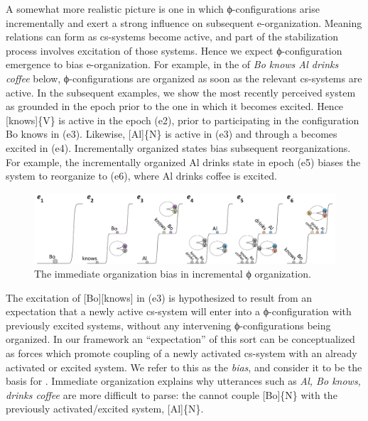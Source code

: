   A somewhat more realistic picture is one in which ϕ-configurations arise incrementally and exert a strong influence on subsequent e-organization. Meaning relations can form as cs-systems become active, and part of the stabilization process involves excitation of those systems. Hence we expect ϕ-configuration emergence to bias e-organization. For example, in the  of \textit{Bo knows Al drinks coffee} below, ϕ-configurations are organized as soon as the relevant cs-systems are active. In the subsequent examples, we show the most recently perceived system as grounded in the epoch prior to the one in which it becomes excited.  Hence [knows]\{V\} is active in the epoch (e2), prior to participating in the configuration {\textbar}Bo knows{\textbar} in (e3). Likewise, [Al]\{N\} is active in (e3) and through a  becomes excited in (e4). Incrementally organized states bias subsequent reorganizations. For example, the incrementally organized {\textbar}Al drinks{\textbar} state in epoch (e5) biases the system to reorganize to (e6), where {\textbar}Al drinks coffee{\textbar} is excited. 

  
\begin{figure}
\includegraphics[width=\textwidth]{figures/Tilsen-img129.png}
\caption{The immediate organization bias in incremental ϕ organization.}
\label{fig:6:10}
\end{figure}
 

  The excitation of [Bo][knows] in (e3) is hypothesized to result from an expectation that a newly active cs-system will enter into a ϕ-configuration with previously excited systems, without any intervening ϕ-configurations being organized. In our framework an “expectation” of this sort can be conceptualized as forces which promote coupling of a newly activated cs-system with an already activated or excited system. We refer to this as the \textit{ bias}, and consider it to be the basis for . Immediate organization explains why utterances such as \textit{Al, Bo knows, drinks coffee} are more difficult to parse: the  cannot couple [Bo]\{N\} with the previously activated/excited system, [Al]\{N\}.

